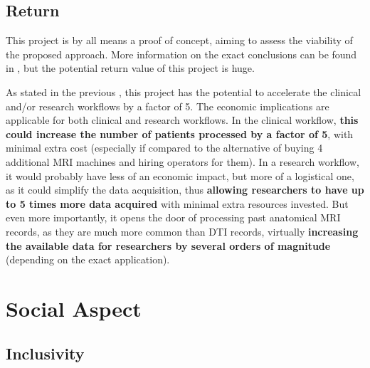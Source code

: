 \subsection{Return}

This project is by all means a proof of concept, aiming to assess the viability of the proposed approach. More information on the exact conclusions can be found in , but the potential return value of this project is huge.\par
As stated in the previous , this project has the potential to accelerate the clinical and/or research workflows by a factor of 5. The economic implications are applicable for both clinical and research workflows. In the clinical workflow, \textbf{this could increase the number of patients processed by a factor of 5}, with minimal extra cost (especially if compared to the alternative of buying 4 additional \ac{MRI} machines and hiring operators for them). In a research workflow, it would probably have less of an economic impact, but more of a logistical one, as it could simplify the data acquisition, thus \textbf{allowing researchers to have up to 5 times more data acquired} with minimal extra resources invested. But even more importantly, it opens the door of processing past anatomical \ac{MRI} records, as they are much more common than \ac{DTI} records, virtually \textbf{increasing the available data for researchers by several orders of magnitude} (depending on the exact application).

\section{Social Aspect}

\subsection{Inclusivity}
\label{sec:inclusive}

